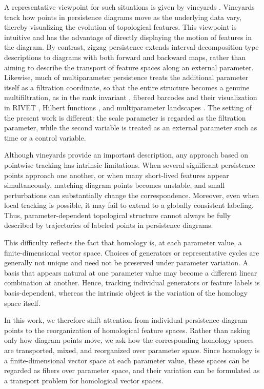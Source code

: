 \documentclass[pdflatex,sn-mathphys-num]{sn-jnl}%
\theoremstyle{thmstyleone}%
\theoremstyle{thmstyletwo}%
\theoremstyle{thmstylethree}%
\begin{document}
A representative viewpoint for such situations is given by vineyards \cite{cohen2006vines,chambers2026braiding}. Vineyards track how points in persistence diagrams move as the underlying data vary, thereby visualizing the evolution of topological features. This viewpoint is intuitive and has the advantage of directly displaying the motion of features in the diagram. By contrast, zigzag persistence \cite{carlsson2010zigzag} extends interval-decomposition-type descriptions to diagrams with both forward and backward maps, rather than aiming to describe the transport of feature spaces along an external parameter. Likewise, much of multiparameter persistence treats the additional parameter itself as a filtration coordinate, so that the entire structure becomes a genuine multifiltration, as in the rank invariant \cite{carlsson2007theory}, fibered barcodes and their visualization in RIVET \cite{lesnick2015interactive}, Hilbert functions \cite{oudot2024stability}, and multiparameter landscapes \cite{vipond2020multiparameter}. The setting of the present work is different: the scale parameter is regarded as the filtration parameter, while the second variable is treated as an external parameter such as time or a control variable.

Although vineyards provide an important description, any approach based on pointwise tracking has intrinsic limitations. When several significant persistence points approach one another, or when many short-lived features appear simultaneously, matching diagram points becomes unstable, and small perturbations can substantially change the correspondence. Moreover, even when local tracking is possible, it may fail to extend to a globally consistent labeling\cite{hickok2022persistence,hickok2022computing}. Thus, parameter-dependent topological structure cannot always be fully described by trajectories of labeled points in persistence diagrams.

This difficulty reflects the fact that homology is, at each parameter value, a finite-dimensional vector space. Choices of generators or representative cycles are generally not unique and need not be preserved under parameter variation. A basis that appears natural at one parameter value may become a different linear combination at another. Hence, tracking individual generators or feature labels is basis-dependent, whereas the intrinsic object is the variation of the homology space itself.

In this work, we therefore shift attention from individual persistence-diagram points to the reorganization of homological feature spaces. Rather than asking only how diagram points move, we ask how the corresponding homology spaces are transported, mixed, and reorganized over parameter space. Since homology is a finite-dimensional vector space at each parameter value, these spaces can be regarded as fibers over parameter space, and their variation can be formulated as a transport problem for homological vector spaces.
\end{document}
